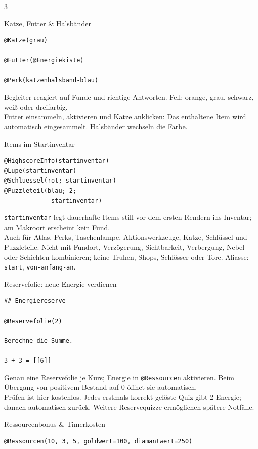 \documentclass[a4paper,landscape,9pt]{extarticle}
\newcommand{\prevsm}[1]{{\footnotesize\color{muted} #1}}
\begin{document}
\begin{multicols}{3}
\begin{lootcard}{Katze, Futter \& Halsbänder}
\begin{lstlisting}[language=lia]
@Katze(grau)

@Futter(@Energiekiste)

@Perk(katzenhalsband-blau)
\end{lstlisting}
\tcblower
\prevsm{Begleiter reagiert auf Funde und richtige Antworten. Fell: orange, grau, schwarz, weiß oder dreifarbig.\\[2pt]
Futter einsammeln, aktivieren und Katze anklicken: Das enthaltene Item wird automatisch eingesammelt. Halsbänder wechseln die Farbe.}
\end{lootcard}

\columnbreak

\begin{lootcard}{Items im Startinventar}
\begin{lstlisting}[language=lia]
@HighscoreInfo(startinventar)
@Lupe(startinventar)
@Schluessel(rot; startinventar)
@Puzzleteil(blau; 2;
             startinventar)
\end{lstlisting}
\tcblower
\prevsm{\texttt{startinventar} legt dauerhafte Items still vor dem ersten Rendern ins Inventar; am Makroort erscheint kein Fund.\\[2pt]
Auch für Atlas, Perks, Taschenlampe, Aktionswerkzeuge, Katze, Schlüssel und Puzzleteile. Nicht mit Fundort, Verzögerung, Sichtbarkeit, Verbergung, Nebel oder Schichten kombinieren; keine Truhen, Shops, Schlösser oder Tore. Aliasse: \texttt{start}, \texttt{von-anfang-an}.}
\end{lootcard}

\begin{lootcard}{Reservefolie: neue Energie verdienen}
\begin{lstlisting}[language=lia]
## Energiereserve

@Reservefolie(2)

Berechne die Summe.

3 + 3 = [[6]]
\end{lstlisting}
\tcblower
\prevsm{Genau eine Reservefolie je Kurs; Energie in \texttt{@Ressourcen} aktivieren. Beim Übergang von positivem Bestand auf 0 öffnet sie automatisch.\\[2pt]
Prüfen ist hier kostenlos. Jedes erstmals korrekt gelöste Quiz gibt 2 Energie; danach automatisch zurück. Weitere Reservequizze ermöglichen spätere Notfälle.}
\end{lootcard}

\begin{lootcard}{Ressourcenbonus \& Timerkosten}
\begin{lstlisting}[language=lia]
@Ressourcen(10, 3, 5, goldwert=100, diamantwert=250)


\end{lstlisting}
\end{lootcard}
\end{multicols}
\end{document}
